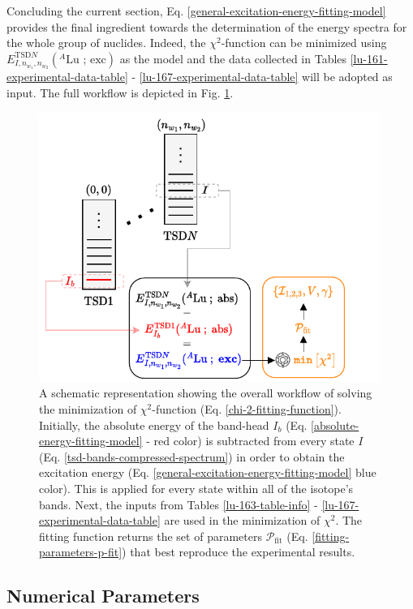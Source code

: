 Concluding the current section, Eq. \ref{general-excitation-energy-fitting-model} provides the final ingredient towards the determination of the energy spectra for the whole group of nuclides. Indeed, the $\chi^2$-function can be minimized using $E_{I,n_{w_1},n_{w_2}}^{\text{TSD}N}(^A\text{Lu\ ;\ exc})$ as the model and the data collected in Tables \ref{lu-161-experimental-data-table} - \ref{lu-167-experimental-data-table} will be adopted as input. The full workflow is depicted in Fig. \ref{fitting-workflow-fig}.
\begin{figure}
    \centering
    \includegraphics[width=0.99\textwidth]{Chapters/Figures/fitting_procedure_chi2.pdf}
    \caption{A schematic representation showing the overall workflow of solving the minimization of $\chi^2$-function (Eq. \ref{chi-2-fitting-function}). Initially, the absolute energy of the band-head $I_b$ (Eq. \ref{absolute-energy-fitting-model} - red color) is subtracted from every state $I$ (Eq. \ref{tsd-bands-compressed-spectrum}) in order to obtain the excitation energy (Eq. \ref{general-excitation-energy-fitting-model} blue color). This is applied for every state within all of the isotope's bands. Next, the inputs from Tables \ref{lu-163-table-info} - \ref{lu-167-experimental-data-table} are used in the minimization of $\chi^2$. The fitting function returns the set of parameters $\mathcal{P}_\text{fit}$ (Eq. \ref{fitting-parameters-p-fit}) that best reproduce the experimental results.}
    \label{fitting-workflow-fig}
\end{figure}

\subsection{Numerical Parameters}


